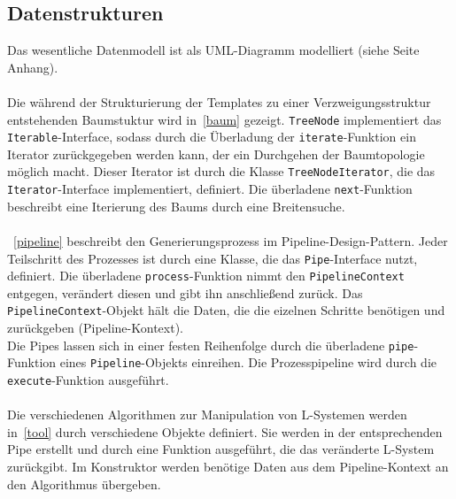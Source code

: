 \subsection*{Datenstrukturen}
Das wesentliche Datenmodell ist als UML-Diagramm modelliert (siehe Seite~\pageref{anhang} Anhang).\\~\\
Die während der Strukturierung der Templates zu einer Verzweigungsstruktur entstehenden Baumstuktur wird in~\ref{baum} gezeigt.
\texttt{TreeNode} implementiert das \texttt{Iterable}-Interface, sodass durch die Überladung der \texttt{iterate}-Funktion
ein Iterator zurückgegeben werden kann, der ein Durchgehen der Baumtopologie möglich macht.
Dieser Iterator ist durch die Klasse \texttt{TreeNodeIterator}, die das \texttt{Iterator}-Interface implementiert, definiert.
Die überladene \texttt{next}-Funktion beschreibt eine Iterierung des Baums durch eine Breitensuche.\\~\\
~\ref{pipeline} beschreibt den Generierungsprozess im Pipeline-Design-Pattern.
Jeder Teilschritt des Prozesses ist durch eine Klasse, die das \texttt{Pipe}-Interface nutzt, definiert.
Die überladene \texttt{process}-Funktion nimmt den \texttt{PipelineContext} entgegen, verändert diesen und gibt ihn
anschließend zurück.
Das \texttt{PipelineContext}-Objekt hält die Daten, die die eizelnen Schritte benötigen und zurückgeben (Pipeline-Kontext).\\
Die Pipes lassen sich in einer festen Reihenfolge durch die überladene \texttt{pipe}-Funktion eines
\texttt{Pipeline}-Objekts einreihen.
Die Prozesspipeline wird durch die \texttt{execute}-Funktion ausgeführt.\\~\\
Die verschiedenen Algorithmen zur Manipulation von L-Systemen werden in~\ref{tool} durch verschiedene Objekte definiert.
Sie werden in der entsprechenden Pipe erstellt und durch eine Funktion ausgeführt, die das veränderte L-System
zurückgibt.
Im Konstruktor werden benötige Daten aus dem Pipeline-Kontext an den Algorithmus übergeben.